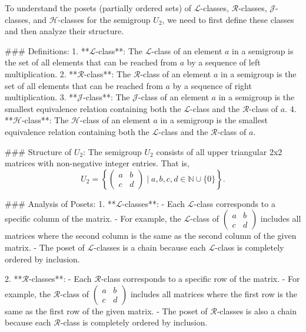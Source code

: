 To understand the posets (partially ordered sets) of \(\mathcal{L}\)-classes, \(\mathcal{R}\)-classes, \(\mathcal{J}\)-classes, and \(\mathcal{H}\)-classes for the semigroup \(U_2\), we need to first define these classes and then analyze their structure.

### Definitions:
1. **\(\mathcal{L}\)-class**: The \(\mathcal{L}\)-class of an element \(a\) in a semigroup is the set of all elements that can be reached from \(a\) by a sequence of left multiplication.
2. **\(\mathcal{R}\)-class**: The \(\mathcal{R}\)-class of an element \(a\) in a semigroup is the set of all elements that can be reached from \(a\) by a sequence of right multiplication.
3. **\(\mathcal{J}\)-class**: The \(\mathcal{J}\)-class of an element \(a\) in a semigroup is the smallest equivalence relation containing both the \(\mathcal{L}\)-class and the \(\mathcal{R}\)-class of \(a\).
4. **\(\mathcal{H}\)-class**: The \(\mathcal{H}\)-class of an element \(a\) in a semigroup is the smallest equivalence relation containing both the \(\mathcal{L}\)-class and the \(\mathcal{R}\)-class of \(a\).

### Structure of \(U_2\):
The semigroup \(U_2\) consists of all upper triangular 2x2 matrices with non-negative integer entries. That is,
\[ U_2 = \left\{ \begin{pmatrix} a & b \\ c & d \end{pmatrix} \mid a, b, c, d \in \mathbb{N} \cup \{0\} \right\}. \]

### Analysis of Posets:
1. **\(\mathcal{L}\)-classes**:
   - Each \(\mathcal{L}\)-class corresponds to a specific column of the matrix.
   - For example, the \(\mathcal{L}\)-class of \(\begin{pmatrix} a & b \\ c & d \end{pmatrix}\) includes all matrices where the second column is the same as the second column of the given matrix.
   - The poset of \(\mathcal{L}\)-classes is a chain because each \(\mathcal{L}\)-class is completely ordered by inclusion.

2. **\(\mathcal{R}\)-classes**:
   - Each \(\mathcal{R}\)-class corresponds to a specific row of the matrix.
   - For example, the \(\mathcal{R}\)-class of \(\begin{pmatrix} a & b \\ c & d \end{pmatrix}\) includes all matrices where the first row is the same as the first row of the given matrix.
   - The poset of \(\mathcal{R}\)-classes is also a chain because each \(\mathcal{R}\)-class is completely ordered by inclusion.

